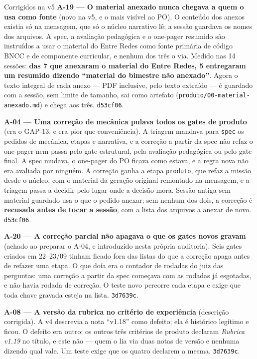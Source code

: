 \documentclass[11pt,a4paper]{article}
\begin{document}
\begin{sucessobox}{Corrigidos na v5}
\textbf{A-19 --- O material anexado nunca chegava a quem o usa como fonte} (novo na v5, e o mais visível ao PO). O conteúdo dos anexos existia só na mensagem, que só o núcleo narrativo lê; a sessão guardava os nomes dos arquivos. A spec, a avaliação pedagógica e o one-pager resumido são instruídos a usar o material do Entre Redes como fonte primária de código BNCC e de componente curricular, e nenhum dos três o via. Medido nas 14 sessões: \textbf{das 7 que anexaram o material do Entre Redes, 5 entregaram um resumido dizendo ``material do bimestre não anexado''}. Agora o texto integral de cada anexo --- PDF inclusive, pelo texto extraído --- é guardado com a sessão, sem limite de tamanho, sai como artefato (\texttt{produto/00-material-anexado.md}) e chega aos três. \texttt{d53cf06}.

\medskip
\textbf{A-04 --- Uma correção de mecânica pulava todos os gates de produto} (era o GAP-13, e era pior que conveniência). A triagem mandava para \texttt{spec} os pedidos de mecânica, etapas e narrativa, e a correção a partir da spec não refaz o one-pager nem passa pelo gate estrutural, pela avaliação pedagógica ou pelo gate final. A spec mudava, o one-pager do PO ficava como estava, e a regra nova não era avaliada por ninguém. A correção ganha a etapa \texttt{produto}, que refaz a missão desde o núcleo, com o material da geração original remontado na mensagem, e a triagem passa a decidir pelo lugar onde a decisão mora. Sessão antiga sem material guardado usa o que o pedido anexar; sem nenhum dos dois, a correção é \textbf{recusada antes de tocar a sessão}, com a lista dos arquivos a anexar de novo. \texttt{d53cf06}.

\medskip
\textbf{A-20 --- A correção parcial não apagava o que os gates novos gravam} (achado ao preparar o A-04, e introduzido nesta própria auditoria). Seis gates criados em 22--23/09 tinham ficado fora das listas do que a correção apaga antes de refazer uma etapa. O que doía era o contador de rodadas do juiz das perguntas: uma correção a partir da spec começava com as rodadas já esgotadas, e não havia rodada de correção. O teste novo percorre cada etapa e exige que toda chave gravada esteja na lista. \texttt{3d7639c}.

\medskip
\textbf{A-08 --- A versão da rubrica no critério de experiência} (descrição corrigida). A v4 descrevia a nota ``v1.18'' como defeito; ela é histórico legítimo e ficou. O defeito era outro: os outros três critérios de produto declaram \emph{Rubrica v1.19} no título, e este não --- quem o lia via duas notas de versão e nenhuma dizendo qual vale. Um teste exige que os quatro declarem a mesma. \texttt{3d7639c}.
\end{sucessobox}
\end{document}
